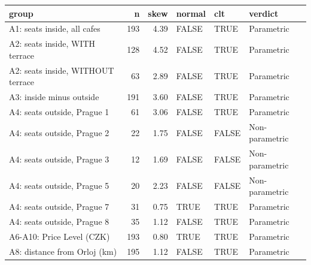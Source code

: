 \begin{tabular}{lrrlll}
  \toprule
group & n & skew & normal & clt & verdict \\ 
  \midrule
A1: seats inside, all cafes & 193 & 4.39 & FALSE & TRUE & Parametric \\ 
  A2: seats inside, WITH terrace & 128 & 4.52 & FALSE & TRUE & Parametric \\ 
  A2: seats inside, WITHOUT terrace &  63 & 2.89 & FALSE & TRUE & Parametric \\ 
  A3: inside minus outside & 191 & 3.60 & FALSE & TRUE & Parametric \\ 
  A4: seats outside, Prague 1 &  61 & 3.06 & FALSE & TRUE & Parametric \\ 
  A4: seats outside, Prague 2 &  22 & 1.75 & FALSE & FALSE & Non-parametric \\ 
  A4: seats outside, Prague 3 &  12 & 1.69 & FALSE & FALSE & Non-parametric \\ 
  A4: seats outside, Prague 5 &  20 & 2.23 & FALSE & FALSE & Non-parametric \\ 
  A4: seats outside, Prague 7 &  31 & 0.75 & TRUE & TRUE & Parametric \\ 
  A4: seats outside, Prague 8 &  35 & 1.12 & FALSE & TRUE & Parametric \\ 
  A6-A10: Price Level (CZK) & 193 & 0.80 & TRUE & TRUE & Parametric \\ 
  A8: distance from Orloj (km) & 195 & 1.12 & FALSE & TRUE & Parametric \\ 
   \bottomrule
\end{tabular}
